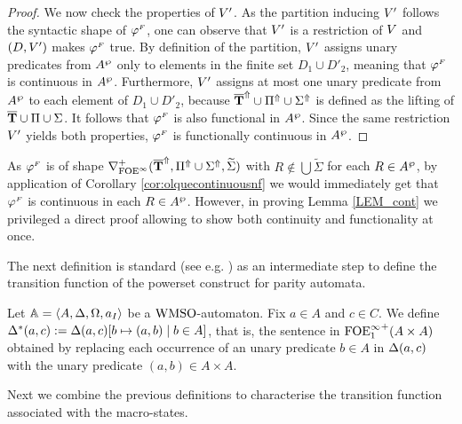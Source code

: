 \begin{proof}
We now check the properties of $V'$. As the partition inducing $V'$ follows the syntactic shape of $\varphi^{{\scriptscriptstyle F}}$, one can observe that $V'$ is a restriction of $V$ and $(D,V')$ makes $\varphi^{{\scriptscriptstyle F}}$ true. By definition of the partition, $V'$ assigns unary predicates from $A^{\wp}$ only to elements in the finite set $D_1 \cup D'_2$, meaning that $\varphi^{{\scriptscriptstyle F}}$ is continuous in $A^{\wp}$. Furthermore, $V'$ assigns at most one unary predicate from $A^{\wp}$ to each element of $D_1 \cup D'_2$, because $\overline{{\mathbf{T}}}^{\Uparrow} \cup \Pi^{\Uparrow} \cup \Sigma^{\Uparrow}$ is defined as the lifting of $\overline{{\mathbf{T}}} \cup \Pi \cup \Sigma$. It follows that $\varphi^{{\scriptscriptstyle F}}$ is also functional in $A^{\wp}$. Since the same restriction $V'$ yields both properties, $\varphi^{{\scriptscriptstyle F}}$ is functionally continuous in $A^{\wp}$.
\end{proof}

\begin{remark} As $\varphi^{{\scriptscriptstyle F}}$ is of shape $\nabla^+_{\mathrm{FOE}^{\infty}}(\overline{{\mathbf{T}}}^{\Uparrow},\Pi^{\Uparrow} \cup \Sigma^{\Uparrow},\widetilde{\Sigma})$ with $R \not\in \bigcup\widetilde{\Sigma}$ for each $R \in A^{\wp}$, by application of Corollary \ref{cor:olquecontinuousnf} we would immediately get that $\varphi^{{\scriptscriptstyle F}}$ is continuous in each $R \in A^{\wp}$. However, in proving Lemma \ref{LEM_cont} we privileged a direct proof allowing to show both continuity and functionality at once.
\end{remark}

The next definition is standard (see e.g.  \cite{Walukiewicz96,Ven08}) as an intermediate step to define the transition function of the powerset construct for parity automata.

\begin{definition}\label{DEF_delta star} Let $\mathbb{A} = \langle{A,\Delta,\Omega,a_I}\rangle$ be a $\mathrm{WMSO}$-automaton. Fix $a \in A$ and $c \in C$. We define $\Delta^{*}(a,c) \mathrel{: =} \Delta(a,c)[b \mapsto (a,b) \mid b \in A]$, that is, the sentence in ${\mathrm{FOE}^{\infty}_1}^+(A\times A)$ obtained by replacing each occurrence of an unary predicate $b \in A$ in $\Delta(a,c)$ with the unary predicate $(a,b) \in A \times A$. \end{definition}

 Next we combine the previous definitions to characterise the transition function associated with the macro-states.

